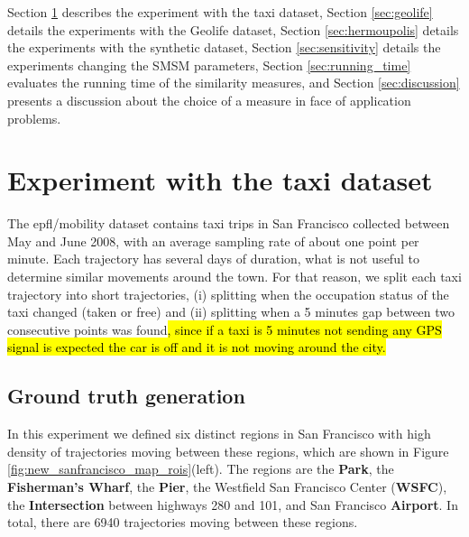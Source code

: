 Section \ref{sec:new_crawdad} describes the experiment with the {taxi} dataset, Section \ref{sec:geolife} details the experiments with the Geolife dataset, Section \ref{sec:hermoupolis} details the experiments with the synthetic dataset, Section {\ref{sec:sensitivity}} details the experiments changing the SMSM parameters, Section {\ref{sec:running_time}} evaluates the running time of the similarity measures, and Section {\ref{sec:discussion}} presents a discussion about the choice of a measure in face of application problems.

\section{Experiment with the taxi dataset}\label{sec:new_crawdad}

The epfl/mobility dataset contains taxi trips in San Francisco collected between May and June 2008, with an average sampling rate of about one point per minute. Each trajectory has several days of duration, what is not useful to determine similar movements around the town. For that reason, we split each taxi trajectory into short trajectories, (i) splitting when the occupation status of the taxi changed (taken or free) and (ii) splitting when a 5 minutes gap between two consecutive points was found\hl{, since if a taxi is 5 minutes not sending any GPS signal is expected the car is off and it is not moving around the city.}

\subsection{Ground truth generation}
{In this experiment we defined six distinct regions in San Francisco with high density of trajectories moving between these regions, which are shown in Figure {\ref{fig:new_sanfrancisco_map_rois}}(left). The regions are the \textbf{Park}, the \textbf{Fisherman's Wharf}, the \textbf{Pier}, the Westfield San Francisco Center (\textbf{WSFC}), the \textbf{Intersection} between highways 280 and 101, and San Francisco \textbf{Airport}. In total, there are 6940 trajectories moving between these regions.}

